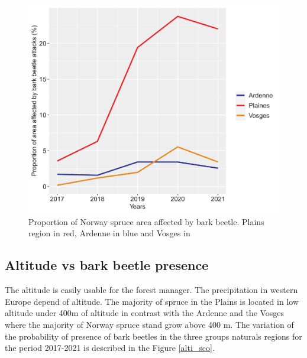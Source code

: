 \documentclass[3p,procedia]{elsarticle}
\begin{document}


\begin{figure}[htbp] 
   \centering
   \includegraphics[width=0.6 \textwidth]{Annual_evol_Ardennes_vosges_plaines.png}
    \caption{Proportion of Norway spruce area affected by bark beetle. Plains region in red, Ardenne in blue and Vosges in }
    \label{evol_gen}
\end{figure}

    


\subsection{ Altitude vs bark beetle presence}
The altitude is easily usable for the forest manager.
The precipitation in western Europe depend of altitude. 
The majority of spruce in the Plains is located in low altitude under 400m of altitude in contrast with the Ardenne and the Vosges where the majority of Norway spruce stand grow above 400 m. 
The variation of the probability of presence of bark beetles in the three groups naturals regions for the period 2017-2021 is described in the Figure \ref{alti_sco}.
\end{document}
